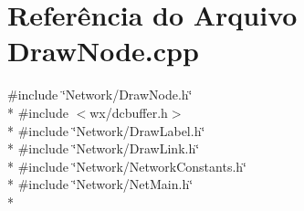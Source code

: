 \section{Referência do Arquivo Draw\+Node.\+cpp}
\label{_draw_node_8cpp}
{\ttfamily \#include \char`\"{}Network/\+Draw\+Node.\+h\char`\"{}}\\*
{\ttfamily \#include $<$wx/dcbuffer.\+h$>$}\\*
{\ttfamily \#include \char`\"{}Network/\+Draw\+Label.\+h\char`\"{}}\\*
{\ttfamily \#include \char`\"{}Network/\+Draw\+Link.\+h\char`\"{}}\\*
{\ttfamily \#include \char`\"{}Network/\+Network\+Constants.\+h\char`\"{}}\\*
{\ttfamily \#include \char`\"{}Network/\+Net\+Main.\+h\char`\"{}}\\*
